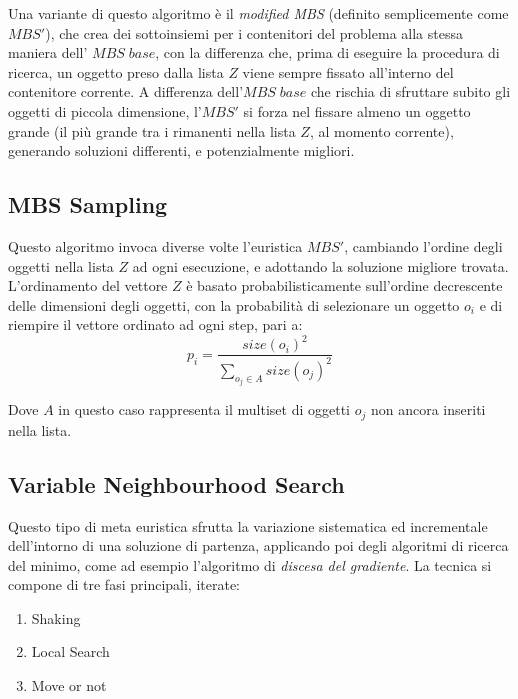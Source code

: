 \documentclass{article}
\begin{document}
\newline
\newline
Una variante di questo algoritmo è il \textit{modified MBS} (definito semplicemente come $MBS'$), che crea dei sottoinsiemi per i contenitori del problema alla stessa maniera dell' $MBS\;base$, con la differenza che, prima di eseguire la procedura di ricerca, un oggetto preso dalla lista $Z$ viene sempre fissato all'interno del contenitore corrente.
\newline
\newline
A differenza dell'$MBS\;base$ che rischia di sfruttare subito gli oggetti di piccola dimensione, l'$MBS'$ si forza nel fissare almeno un oggetto grande (il più grande tra i rimanenti nella lista $Z$, al momento corrente), generando soluzioni differenti, e potenzialmente migliori.
 
\subsection{MBS Sampling}
Questo algoritmo invoca diverse volte l'euristica $MBS'$, cambiando l'ordine degli oggetti nella lista $Z$ ad ogni esecuzione, e adottando la soluzione migliore trovata.
\newline
\newline
L'ordinamento del vettore $Z$ è basato probabilisticamente sull'ordine decrescente delle dimensioni degli oggetti, con la probabilità di selezionare un oggetto $o_i$ e di riempire il vettore ordinato ad ogni step, pari a:
\[
p_i = \frac{size(o_i)^{2}}{\sum_{o_{j} \in A }size(o_{j})^{2}}
\]

Dove $A$ in questo caso rappresenta il multiset di oggetti $o_j$ non ancora inseriti nella lista.

\subsection{Variable Neighbourhood Search}

Questo tipo di meta euristica sfrutta la variazione sistematica ed incrementale dell'intorno di una soluzione di partenza, applicando poi degli algoritmi di ricerca del minimo, come ad esempio l'algoritmo di \textit{discesa del gradiente}.
\newline
\newline
La tecnica si compone di tre fasi principali, iterate:
\begin{enumerate}
\item Shaking
\item Local Search
\item Move or not
\end{enumerate}
\end{document}
